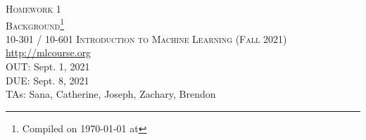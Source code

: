 \documentclass[11pt,addpoints,answers]{exam}
\title{\textsc{\hwName}} %
\author{}
\date{}
\date{}
\numberwithin{equation}{section} %
\numberwithin{figure}{section} %
\numberwithin{table}{section} %
\newcommand{\courseNum}{10-301 / 10-601}
\newcommand{\courseName}{Introduction to Machine Learning}
\newcommand{\courseSem}{Fall 2021}
\newcommand{\courseUrl}{\url{http://mlcourse.org}}
\newcommand{\hwNum}{Homework 1}
\newcommand{\hwTopic}{Background}
\newcommand{\outDate}{Sept. 1, 2021}
\newcommand{\dueDate}{Sept. 8, 2021}
\newcommand{\taNames}{Sana, Catherine, Joseph, Zachary, Brendon}
\begin{document}
\section*{}
\begin{center}
  \textsc{\LARGE \hwNum} \\
  \textsc{\LARGE \hwTopic\footnote{Compiled on \today{} at \currenttime{}}} \\
  \vspace{1em}
  \textsc{\large \courseNum{} \courseName{} (\courseSem)} \\
  \courseUrl\\
  \vspace{1em}
  OUT: \outDate \\
  DUE: \dueDate \\
  TAs: \taNames
\end{center}
\end{document}
